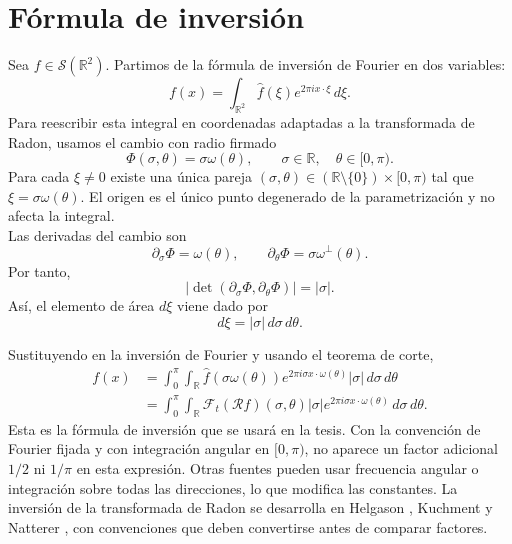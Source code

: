 \section{Fórmula de inversión}

Sea $f\in\mathcal S(\mathbb R^2)$. Partimos de la fórmula de inversión de Fourier en dos variables:
\[
f(x)=
\int_{\mathbb R^2}
\widehat f(\xi)e^{2\pi i x\cdot\xi}\,d\xi.
\]
Para reescribir esta integral en coordenadas adaptadas a la transformada de Radon, usamos el cambio con radio firmado
\[
\Phi(\sigma,\theta)=\sigma\omega(\theta),
\qquad
\sigma\in\mathbb R,
\quad
\theta\in[0,\pi).
\]
Para cada $\xi\neq0$ existe una única pareja
$(\sigma,\theta)\in(\mathbb R\setminus\{0\})\times[0,\pi)$
tal que $\xi=\sigma\omega(\theta)$. El origen es el único punto
degenerado de la parametrización y no afecta la integral.\\

Las derivadas del cambio son
\[
\partial_\sigma\Phi=\omega(\theta),
\qquad
\partial_\theta\Phi=\sigma\omega^\perp(\theta).
\]
Por tanto,
\[
\left|
\det\left(
\partial_\sigma\Phi,
\partial_\theta\Phi
\right)
\right|
=
|\sigma|.
\]
Así, el elemento de área $d\xi$ viene dado por
\[
d\xi=|\sigma|\,d\sigma\,d\theta.
\]

Sustituyendo en la inversión de Fourier y usando el teorema de corte,
\[
\begin{aligned}
f(x)
&=
\int_0^\pi\int_{\mathbb R}
\widehat f(\sigma\omega(\theta))
e^{2\pi i\sigma x\cdot\omega(\theta)}
|\sigma|\,d\sigma\,d\theta \\
&=
\int_0^\pi\int_{\mathbb R}
\mathcal F_t(\mathcal Rf)(\sigma,\theta)
|\sigma|
e^{2\pi i\sigma x\cdot\omega(\theta)}
\,d\sigma\,d\theta.
\end{aligned}
\]
Esta es la fórmula de inversión que se usará en la tesis. Con la convención de Fourier fijada y con integración angular en $[0,\pi)$, no aparece un factor adicional $1/2$ ni $1/\pi$ en esta expresión. Otras fuentes pueden usar frecuencia angular o integración sobre todas las direcciones, lo que modifica las constantes. La inversión de la transformada de Radon se desarrolla en Helgason \cite{helgason1999}, Kuchment \cite[Sec.~5.7, pp.~36--39]{kuchment2014} y Natterer \cite[Sec.~II.2, Thm.~2.1, pp.~18--20]{natterer2001}, con convenciones que deben convertirse antes de comparar factores.
